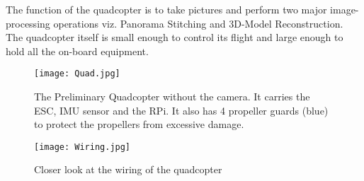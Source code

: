 \newline
The function of the quadcopter is to take pictures and perform two major image-processing operations viz. Panorama Stitching and 3D-Model Reconstruction.
\newline
The quadcopter itself is small enough to control its flight and large enough to hold all the on-board equipment.
\begin{figure}[H]
  \centering
  \texttt{[image: Quad.jpg]}
  \caption{The Preliminary Quadcopter without the camera. It carries the ESC, IMU sensor and the RPi. It also has 4 propeller guards (blue) to protect the propellers from excessive damage. }
  \label{first quadcopter}	
\end{figure}

\begin{figure}[H]
  \centering
  \texttt{[image: Wiring.jpg]}
  \caption{Closer look at the wiring of the quadcopter}
  \label{second quadcopter}	
\end{figure}

